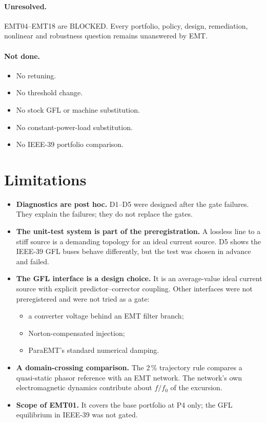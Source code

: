 \documentclass[10pt,a4paper]{article}
\begin{document}
\paragraph{Unresolved.} EMT04--EMT18 are BLOCKED. Every portfolio, policy,
design, remediation, nonlinear and robustness question remains unanswered by
EMT.

\paragraph{Not done.}
\begin{itemize}
\item No retuning.
\item No threshold change.
\item No stock GFL or machine substitution.
\item No constant-power-load substitution.
\item No IEEE-39 portfolio comparison.
\end{itemize}

\section{Limitations}
\begin{itemize}
\item \textbf{Diagnostics are post hoc.} D1--D5 were designed after the gate
  failures. They explain the failures; they do not replace the gates.
\item \textbf{The unit-test system is part of the preregistration.} A lossless
  line to a stiff source is a demanding topology for an ideal current source.
  D5 shows the IEEE-39 GFL buses behave differently, but the test was chosen
  in advance and failed.
\item \textbf{The GFL interface is a design choice.} It is an average-value
  ideal current source with explicit predictor--corrector coupling. Other
  interfaces were not preregistered and were not tried as a gate:
  \begin{itemize}
  \item a converter voltage behind an EMT filter branch;
  \item Norton-compensated injection;
  \item ParaEMT's standard numerical damping.
  \end{itemize}
\item \textbf{A domain-crossing comparison.} The 2\,\% trajectory rule
  compares a quasi-static phasor reference with an EMT network. The network's
  own electromagnetic dynamics contribute about $f/f_0$ of the excursion.
\item \textbf{Scope of EMT01.} It covers the base portfolio at P4 only; the
  GFL equilibrium in IEEE-39 was not gated.
\end{itemize}
\end{document}
